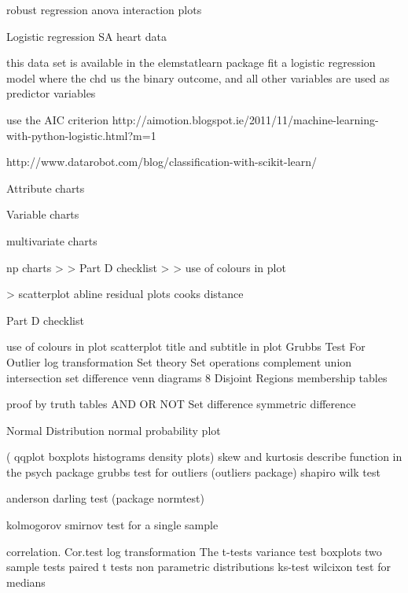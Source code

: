 ﻿





robust regression
 anova
 interaction plots

Logistic regression
 SA heart data
 
this data set is available in the elemstatlearn package
 fit a logistic regression model where the chd us the binary outcome, and all other variables are used as predictor variables
 
use the AIC criterion 
http://aimotion.blogspot.ie/2011/11/machine-learning-with-python-logistic.html?m=1
 
http://www.datarobot.com/blog/classification-with-scikit-learn/


Attribute charts
 
Variable charts
 
multivariate charts
 
np charts
>
 > Part D checklist
 >
 > use of colours in plot

 > scatterplot abline
 residual plots
 cooks distance

Part D checklist
 
use of colours in plot
 scatterplot
 title and subtitle in plot
 Grubbs Test For Outlier
 log transformation
Set theory
 Set operations
 complement
 union intersection
 set difference
 venn diagrams
 8 Disjoint Regions
 membership tables
 
proof by truth tables
 AND
 OR
 NOT
 Set difference
 symmetric difference



Normal Distribution 
normal probability plot 

( qqplot boxplots histograms density plots)
 skew and kurtosis describe function in the psych package 
grubbs test for outliers (outliers package)
 shapiro wilk test
 
anderson darling test (package normtest)
 
kolmogorov smirnov test for a single sample
 
correlation. Cor.test
 log transformation
 The t-tests 
variance test boxplots
 two sample tests 
paired t tests
 non parametric distributions
 ks-test
 wilcixon test for medians




